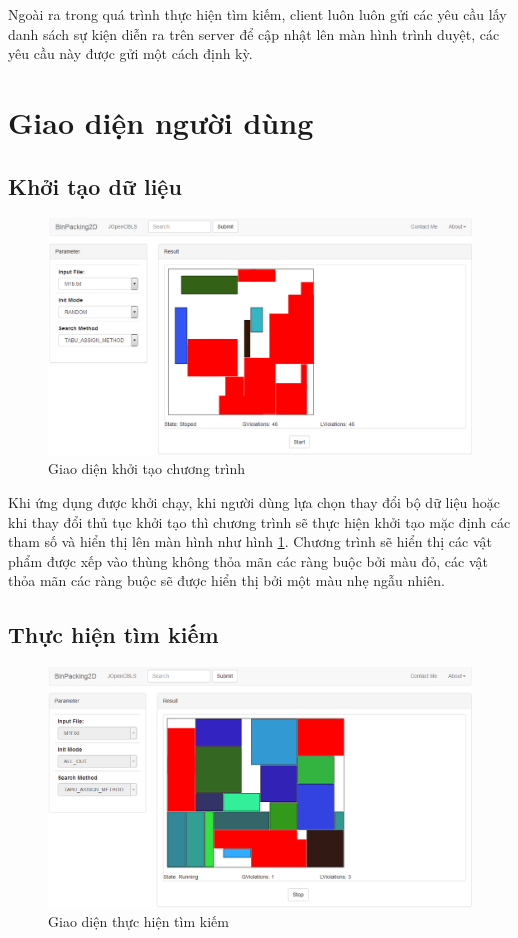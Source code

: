 Ngoài ra trong quá trình thực hiện tìm kiếm, client luôn luôn gửi các yêu cầu lấy danh sách sự kiện diễn ra trên server để cập nhật lên màn hình trình duyệt, các yêu cầu này được gửi một cách định kỳ.

\section{Giao diện người dùng}
\subsection*{Khởi tạo dữ liệu}
\begin{figure}[H]
	\centering
	\includegraphics[scale=0.5]{figures/if-init.png}
	\caption{Giao diện khởi tạo chương trình \label{fig:ifInit}}
\end{figure}

Khi ứng dụng được khởi chạy, khi người dùng lựa chọn thay đổi bộ dữ liệu hoặc khi thay đổi thủ tục khởi tạo thì chương trình sẽ thực hiện khởi tạo mặc định các tham số và hiển thị lên màn hình như hình \ref{fig:ifInit}. Chương trình sẽ hiển thị các vật phẩm được xếp vào thùng không thỏa mãn các ràng buộc bởi màu đỏ, các vật thỏa mãn các ràng buộc sẽ được hiển thị bởi một màu nhẹ ngẫu nhiên.
\subsection*{Thực hiện tìm kiếm}
\begin{figure}
	\centering
	\includegraphics[scale=0.5]{figures/if-progress.png}
	\caption{Giao diện thực hiện tìm kiếm \label{fig:ifProgress}}
\end{figure}

